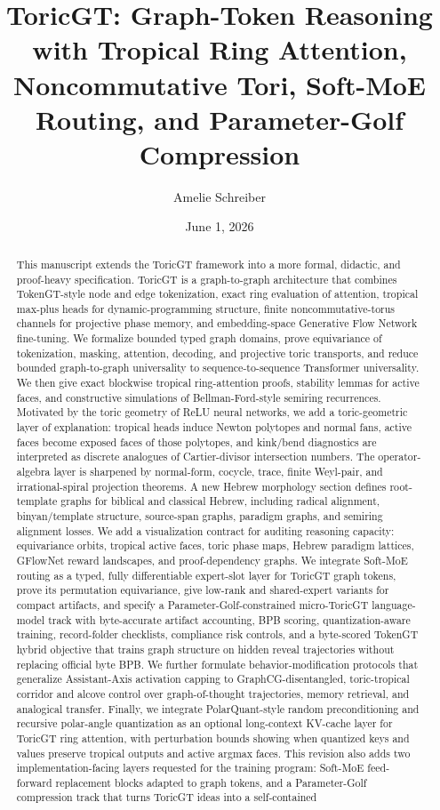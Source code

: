 \documentclass[11pt]{article}
\title{\vspace{-2em}ToricGT: Graph-Token Reasoning with Tropical Ring Attention, Noncommutative Tori, Soft-MoE Routing, and Parameter-Golf Compression}
\author{Amelie Schreiber}
\date{June 1, 2026}
\theoremstyle{definition}
\theoremstyle{plain}
\theoremstyle{remark}
\numberwithin{equation}{section}
\begin{document}
\maketitle

\begin{abstract}
This manuscript extends the ToricGT framework into a more formal, didactic, and proof-heavy specification.  ToricGT is a graph-to-graph architecture that combines TokenGT-style node and edge tokenization, exact ring evaluation of attention, tropical max-plus heads for dynamic-programming structure, finite noncommutative-torus channels for projective phase memory, and embedding-space Generative Flow Network fine-tuning.  We formalize bounded typed graph domains, prove equivariance of tokenization, masking, attention, decoding, and projective toric transports, and reduce bounded graph-to-graph universality to sequence-to-sequence Transformer universality.  We then give exact blockwise tropical ring-attention proofs, stability lemmas for active faces, and constructive simulations of Bellman-Ford-style semiring recurrences.  Motivated by the toric geometry of ReLU neural networks, we add a toric-geometric layer of explanation: tropical heads induce Newton polytopes and normal fans, active faces become exposed faces of those polytopes, and kink/bend diagnostics are interpreted as discrete analogues of Cartier-divisor intersection numbers.  The operator-algebra layer is sharpened by normal-form, cocycle, trace, finite Weyl-pair, and irrational-spiral projection theorems.  A new Hebrew morphology section defines root-template graphs for biblical and classical Hebrew, including radical alignment, binyan/template structure, source-span graphs, paradigm graphs, and semiring alignment losses.  We add a visualization contract for auditing reasoning capacity: equivariance orbits, tropical active faces, toric phase maps, Hebrew paradigm lattices, GFlowNet reward landscapes, and proof-dependency graphs.  We integrate Soft-MoE routing as a typed, fully differentiable expert-slot layer for ToricGT graph tokens, prove its permutation equivariance, give low-rank and shared-expert variants for compact artifacts, and specify a Parameter-Golf-constrained micro-ToricGT language-model track with byte-accurate artifact accounting, BPB scoring, quantization-aware training, record-folder checklists, compliance risk controls, and a byte-scored TokenGT hybrid objective that trains graph structure on hidden reveal trajectories without replacing official byte BPB.  We further formulate behavior-modification protocols that generalize Assistant-Axis activation capping to GraphCG-disentangled, toric-tropical corridor and alcove control over graph-of-thought trajectories, memory retrieval, and analogical transfer.  Finally, we integrate PolarQuant-style random preconditioning and recursive polar-angle quantization as an optional long-context KV-cache layer for ToricGT ring attention, with perturbation bounds showing when quantized keys and values preserve tropical outputs and active argmax faces.  This revision also adds two implementation-facing layers requested for the training program: Soft-MoE feed-forward replacement blocks adapted to graph tokens, and a Parameter-Golf compression track that turns ToricGT ideas into a self-contained 
\end{abstract}
\end{document}

